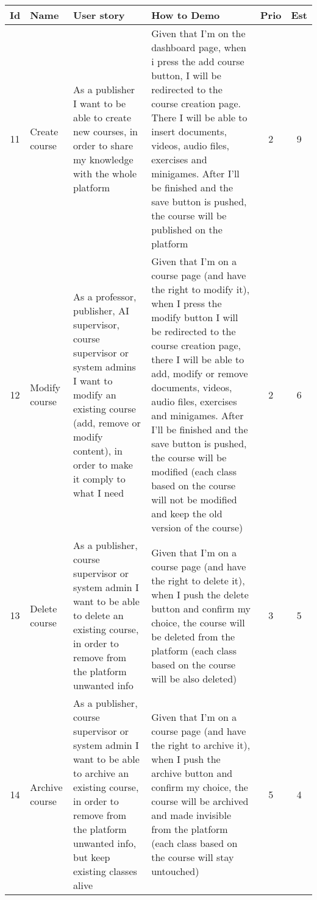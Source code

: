 \newpage
\begin{tabular}{|c|m{1.5cm}|m{4cm}|m{4cm}|c|c|}
	\hline
	\textbf{Id}&\textbf{Name}&\textbf{User story}&\textbf{How to Demo}&\textbf{Prio}&\textbf{Est}\\
	\hline
	11 & Create course & 
	As a publisher I want to be able to create new courses, in order to share my knowledge with the whole platform & 
	Given that I'm on the dashboard page, when i press the add course button, I will be redirected to the course creation page. There I will be able to insert documents, videos, audio files, exercises and minigames. After I'll be finished and the save button is pushed, the course will be published on the platform &
	2 & 9 \\
	\hline
	12 & Modify course & 
	As a professor, publisher, AI supervisor, course supervisor or system admins I want to modify an existing course (add, remove or modify content), in order to make it comply to what I need & 
	Given that I'm on a course page (and have the right to modify it), when I press the modify button I will be redirected to the course creation page, there I will be able to add, modify or remove documents, videos, audio files, exercises and minigames. After I'll be finished and the save button is pushed, the course will be modified (each class based on the course will not be modified and keep the old version of the course) &
	2 & 6 \\
	\hline
	13 & Delete course & 
	As a publisher, course supervisor or system admin I want to be able to delete an existing course, in order to remove from the platform unwanted info & 
	Given that I'm on a course page (and have the right to delete it), when I push the delete button and confirm my choice, the course will be deleted from the platform (each class based on the course will be also deleted) &
	3 & 5 \\
	\hline
	14 & Archive course & 
	As a publisher, course supervisor or system admin I want to be able to archive an existing course, in order to remove from the platform unwanted info, but keep existing classes alive & 
	Given that I'm on a course page (and have the right to archive it), when I push the archive button and confirm my choice, the course will be archived and made invisible from the platform (each class based on the course will stay untouched) &
	5 & 4 \\
	\hline
\end{tabular}    
\newpage    
